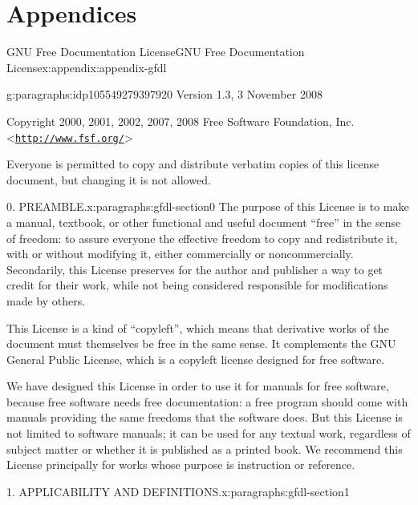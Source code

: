 \documentclass[twoside,10pt,]{book}
\numberwithin{equation}{part}
\begin{document}
\part*{Appendices}%
%
%
\typeout{************************************************}
\typeout{************************************************}
%
\begin{appendixptx}{GNU Free Documentation License}{}{GNU Free Documentation License}{}{}{x:appendix:appendix-gfdl}
\begin{paragraphs}{}{g:paragraphs:idp105549279397920}%
Version 1.3, 3 November 2008%
\par
Copyright \textcopyright{} 2000, 2001, 2002, 2007, 2008 Free Software Foundation, Inc. \textless{}\href{http://www.fsf.org/}{\nolinkurl{http://www.fsf.org/}}\textgreater{}%
\par
Everyone is permitted to copy and distribute verbatim copies of this license document, but changing it is not allowed.%
\end{paragraphs}%
\begin{paragraphs}{0. PREAMBLE.}{x:paragraphs:gfdl-section0}%
The purpose of this License is to make a manual, textbook, or other functional and useful document ``free'' in the sense of freedom: to assure everyone the effective freedom to copy and redistribute it, with or without modifying it, either commercially or noncommercially. Secondarily, this License preserves for the author and publisher a way to get credit for their work, while not being considered responsible for modifications made by others.%
\par
This License is a kind of ``copyleft'', which means that derivative works of the document must themselves be free in the same sense. It complements the GNU General Public License, which is a copyleft license designed for free software.%
\par
We have designed this License in order to use it for manuals for free software, because free software needs free documentation: a free program should come with manuals providing the same freedoms that the software does. But this License is not limited to software manuals; it can be used for any textual work, regardless of subject matter or whether it is published as a printed book. We recommend this License principally for works whose purpose is instruction or reference.%
\end{paragraphs}%
\begin{paragraphs}{1. APPLICABILITY AND DEFINITIONS.}{x:paragraphs:gfdl-section1}%

\end{paragraphs}
\end{appendixptx}
\end{document}
